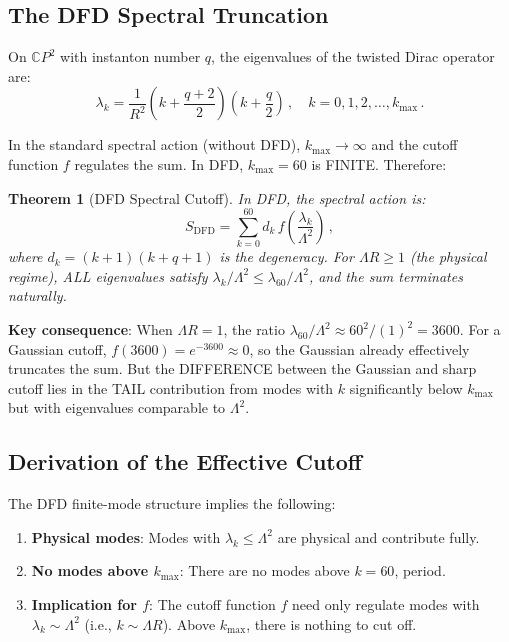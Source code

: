 \documentclass[11pt,a4paper]{article}
\newtheorem{theorem}{Theorem}
\newcommand{\CP}{\mathbb{C}P}
\begin{document}
\subsection{The DFD Spectral Truncation}

On $\CP^2$ with instanton number $q$, the eigenvalues of the twisted Dirac operator are:
\begin{equation}
\lambda_k = \frac{1}{R^2}\left(k + \frac{q + 2}{2}\right)\left(k + \frac{q}{2}\right)\,, \quad k = 0, 1, 2, \ldots, k_{\max}\,.
\end{equation}

In the standard spectral action (without DFD), $k_{\max} \to \infty$ and the cutoff function $f$ regulates the sum. In DFD, $k_{\max} = 60$ is FINITE. Therefore:

\begin{theorem}[DFD Spectral Cutoff]
\label{thm:sharp-cutoff}
In DFD, the spectral action is:
\begin{equation}
S_{\mathrm{DFD}} = \sum_{k=0}^{60} d_k\,f\!\left(\frac{\lambda_k}{\Lambda^2}\right)\,,
\end{equation}
where $d_k = (k+1)(k+q+1)$ is the degeneracy. For $\Lambda R \geq 1$ (the physical regime), ALL eigenvalues satisfy $\lambda_k/\Lambda^2 \leq \lambda_{60}/\Lambda^2$, and the sum terminates naturally.
\end{theorem}

\textbf{Key consequence}: When $\Lambda R = 1$, the ratio $\lambda_{60}/\Lambda^2 \approx 60^2/(1)^2 = 3600$. For a Gaussian cutoff, $f(3600) = e^{-3600} \approx 0$, so the Gaussian already effectively truncates the sum. But the DIFFERENCE between the Gaussian and sharp cutoff lies in the TAIL contribution from modes with $k$ significantly below $k_{\max}$ but with eigenvalues comparable to $\Lambda^2$.

\subsection{Derivation of the Effective Cutoff}

The DFD finite-mode structure implies the following:

\begin{enumerate}
\item \textbf{Physical modes}: Modes with $\lambda_k \leq \Lambda^2$ are physical and contribute fully.
\item \textbf{No modes above $k_{\max}$}: There are no modes above $k = 60$, period.
\item \textbf{Implication for $f$}: The cutoff function $f$ need only regulate modes with $\lambda_k \sim \Lambda^2$ (i.e., $k \sim \Lambda R$). Above $k_{\max}$, there is nothing to cut off.
\end{enumerate}
\end{document}
